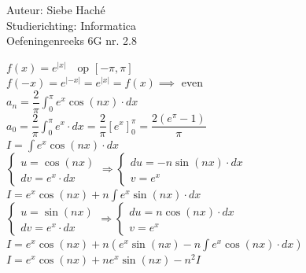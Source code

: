 \documentclass[a4paper]{article}
\begin{document}
\noindent \large Auteur: Siebe Haché \\
\noindent \large Studierichting: Informatica \\
\noindent \large Oefeningenreeks 6G nr. 2.8 \\

\medskip
\normalsize

$f(x) = e^{|x|} \quad \text{op } [-\pi, \pi]$ \\

$f(-x) = e^{|-x|} = e^{|x|} = f(x) \implies$ even \\

$a_n = \dfrac{2}{\pi} \displaystyle\int_{0}^{\pi} e^x \cos(nx) \cdot dx$ \\

$a_0 = \dfrac{2}{\pi} \displaystyle\int_{0}^{\pi} e^x \cdot dx = \dfrac{2}{\pi} \left[ e^x \right]_0^{\pi} = \dfrac{2\left( e^{\pi} - 1 \right)}{\pi}$ \\

$I = \displaystyle\int e^x \cos(nx) \cdot dx$ \\

$\left\{ \begin{array}{l} 
    u = \cos(nx) \\
    dv = e^x \cdot dx 
\end{array} \right.
\Rightarrow
\left\{ \begin{array}{l} 
    du = -n \sin(nx) \cdot dx \\
    v = e^x
\end{array} \right.$ \\

$I = e^x \cos(nx) + n \displaystyle\int e^x \sin(nx) \cdot dx$ \\

$\left\{ \begin{array}{l} 
    u = \sin(nx) \\
    dv = e^x \cdot dx 
\end{array} \right.
\Rightarrow
\left\{ \begin{array}{l} 
    du = n \cos(nx) \cdot dx \\
    v = e^x
\end{array} \right.$ \\

$I = e^x \cos(nx) + n \left( e^x \sin(nx) - n \displaystyle\int e^x \cos(nx) \cdot dx \right)$ \\

$I = e^x \cos(nx) + n e^x \sin(nx) - n^2 I$ \\
\end{document}
